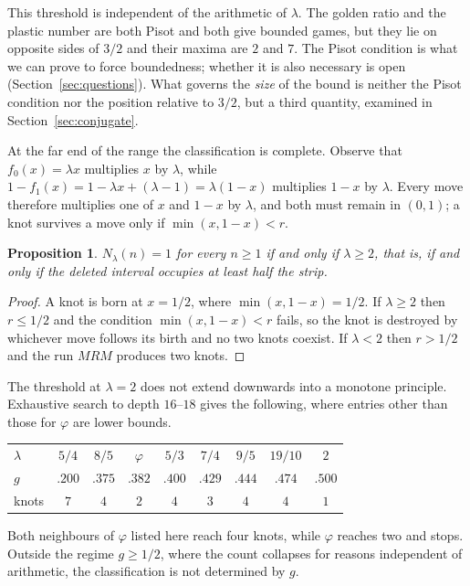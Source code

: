 \documentclass[11pt,reqno]{amsart}
\theoremstyle{plain}
\newtheorem{proposition}[theorem]{Proposition}
\theoremstyle{definition}
\theoremstyle{remark}
\begin{document}
This threshold is independent of the arithmetic of $\lambda$. The golden ratio
and the plastic number are both Pisot and both give bounded games, but they lie
on opposite sides of $3/2$ and their maxima are $2$ and $7$. The Pisot condition is what we can prove to
force boundedness; whether it is also necessary is open
(Section~\ref{sec:questions}). What governs the \emph{size} of the bound is
neither the Pisot condition nor the position relative to $3/2$, but a third
quantity, examined in Section~\ref{sec:conjugate}.

At the far end of the range the classification is complete. Observe that
$f_0(x)=\lambda x$ multiplies $x$ by $\lambda$, while
$1-f_1(x)=1-\lambda x+(\lambda-1)=\lambda(1-x)$ multiplies $1-x$ by $\lambda$.
Every move therefore multiplies one of $x$ and $1-x$ by $\lambda$, and both must
remain in $(0,1)$; a knot survives a move only if $\min(x,1-x)<r$.

\begin{proposition}\label{prop:big}
$N_\lambda(n)=1$ for every $n\geq1$ if and only if $\lambda\geq2$, that is, if
and only if the deleted interval occupies at least half the strip.
\end{proposition}

\begin{proof}
A knot is born at $x=1/2$, where $\min(x,1-x)=1/2$. If $\lambda\geq2$ then
$r\leq1/2$ and the condition $\min(x,1-x)<r$ fails, so the knot is destroyed by
whichever move follows its birth and no two knots coexist. If $\lambda<2$ then
$r>1/2$ and the run $MRM$ produces two knots.
\end{proof}

The threshold at $\lambda=2$ does not extend downwards into a monotone
principle. Exhaustive search to depth $16$--$18$ gives the following, where
entries other than those for $\varphi$ are lower bounds.

\begin{center}
\begin{tabular}{lcccccccc}
\toprule
$\lambda$ & $5/4$ & $8/5$ & $\varphi$ & $5/3$ & $7/4$ & $9/5$ & $19/10$ & $2$\\
$g$ & $.200$ & $.375$ & $.382$ & $.400$ & $.429$ & $.444$ & $.474$ & $.500$\\
\midrule
knots & $7$ & $4$ & $2$ & $4$ & $3$ & $4$ & $4$ & $1$\\
\bottomrule
\end{tabular}
\end{center}

Both neighbours of $\varphi$ listed here reach four knots, while $\varphi$
reaches two and stops. Outside the regime $g\geq1/2$, where the count collapses
for reasons independent of arithmetic, the classification is not determined by
$g$.
\end{document}
